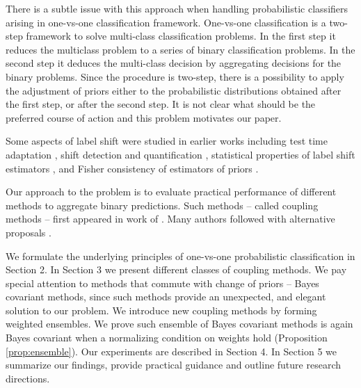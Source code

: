 There is a subtle issue with this approach  when handling probabilistic classifiers arising in one-vs-one classification framework.   One-vs-one classification is a two-step framework to solve  multi-class classification problems. In the first step it reduces the multiclass problem to a series of binary classification problems. In the second step it deduces the multi-class decision by aggregating decisions for the binary problems. Since the procedure is two-step, there is a possibility to apply the adjustment of priors either to the probabilistic distributions obtained after the first step, or after the second step. It is not clear what should be the preferred course of action and this problem motivates our paper. 

Some aspects of label shift were studied in earlier works including test time adaptation
\cite{vsipka2022hitchhiker}, shift detection and quantification \cite{lipton2018detecting}, statistical properties of label shift estimators \cite{garg2020unified}, and Fisher consistency of estimators of priors \cite{tasche2017fisher}.


Our approach to the problem is to evaluate practical performance of different methods to aggregate binary predictions. Such methods -- called coupling methods -- first appeared in work of \cite{refregier1991probabilistic}. Many authors followed with alternative proposals \cite{price1994pairwise, hastie1998classification,  zahorian1999partitioned, wu2004probability, vsuch2015new, vsuch2016bayes}.

We formulate the underlying principles of one-vs-one probabilistic classification in Section 2. In Section 3 we present  different classes of coupling methods. 
We pay special attention to methods that commute with change of priors -- Bayes covariant methods, 
since such methods provide an unexpected, and elegant solution to our problem. 
We introduce new coupling methods by forming weighted ensembles. We prove such ensemble of Bayes covariant methods is again Bayes covariant
when a normalizing condition on weights hold (Proposition \ref{prop:ensemble}).  
Our experiments are described in Section 4. In Section 5 we summarize our findings, 
provide practical guidance and outline future research directions.